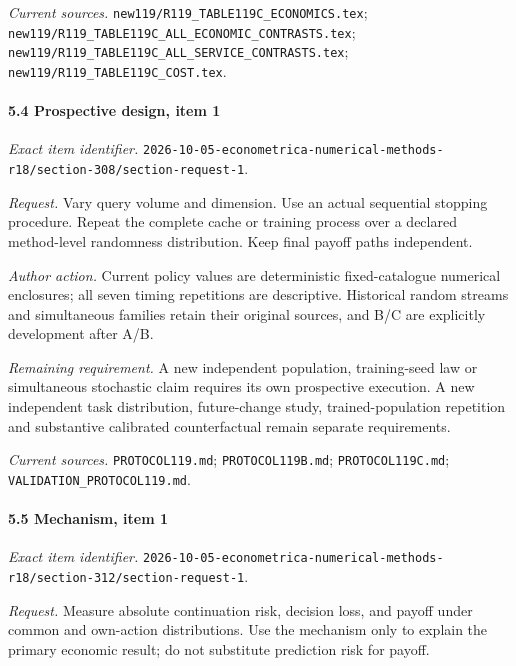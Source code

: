 \par\emph{Current sources.} \nolinkurl{new119/R119_TABLE119C_ECONOMICS.tex}; \nolinkurl{new119/R119_TABLE119C_ALL_ECONOMIC_CONTRASTS.tex}; \nolinkurl{new119/R119_TABLE119C_ALL_SERVICE_CONTRASTS.tex}; \nolinkurl{new119/R119_TABLE119C_COST.tex}.

\paragraph{5.4 Prospective design, item 1}

\emph{Exact item identifier.} \nolinkurl{2026-10-05-econometrica-numerical-methods-r18/section-308/section-request-1}.

\par\emph{Request.} Vary query volume and dimension. Use an actual sequential stopping procedure. Repeat the complete cache or training process over a declared method-level randomness distribution. Keep final payoff paths independent.

\par\emph{Author action.} Current policy values are deterministic fixed-catalogue numerical enclosures; all seven timing repetitions are descriptive. Historical random streams and simultaneous families retain their original sources, and B/\allowbreak{}C are explicitly development after A/\allowbreak{}B.

\par\emph{Remaining requirement.} A new independent population, training-seed law or simultaneous stochastic claim requires its own prospective execution. A new independent task distribution, future-change study, trained-population repetition and substantive calibrated counterfactual remain separate requirements.

\par\emph{Current sources.} \nolinkurl{PROTOCOL119.md}; \nolinkurl{PROTOCOL119B.md}; \nolinkurl{PROTOCOL119C.md}; \nolinkurl{VALIDATION_PROTOCOL119.md}.

\paragraph{5.5 Mechanism, item 1}

\emph{Exact item identifier.} \nolinkurl{2026-10-05-econometrica-numerical-methods-r18/section-312/section-request-1}.

\par\emph{Request.} Measure absolute continuation risk, decision loss, and payoff under common and own-action distributions. Use the mechanism only to explain the primary economic result; do not substitute prediction risk for payoff.

